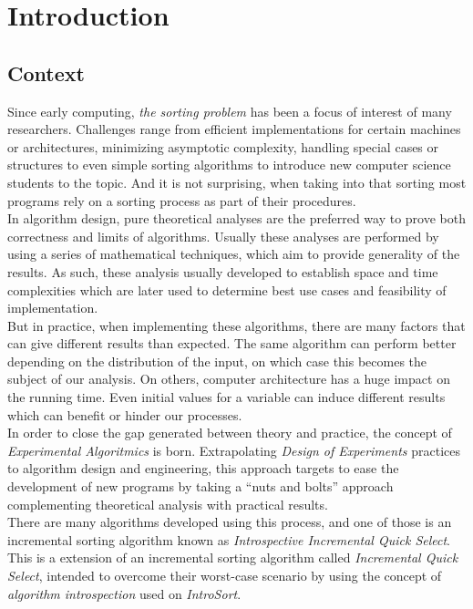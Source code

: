 \chapter{Introduction}

\section{Context}

Since early computing, \emph{the sorting problem} has been a focus of interest of many researchers. Challenges range from efficient implementations for certain machines or architectures, minimizing asymptotic complexity, handling special cases or structures to even simple sorting algorithms to introduce new computer science students to the topic. And it is not surprising, when taking into  that sorting most programs rely on a sorting process as part of their procedures.\\

In algorithm design, pure theoretical analyses are the preferred way to prove both correctness and limits of algorithms. Usually these analyses are performed by using a series of mathematical techniques, which aim to provide generality of the results. As such, these analysis usually developed to establish space and time complexities which are later used to determine best use cases and feasibility of implementation.\\

But in practice, when implementing these algorithms, there are many factors that can give different results than expected. The same algorithm can perform better depending on the distribution of the input, on which case this becomes the subject of our analysis. On others, computer architecture has a huge impact on the running time. Even initial values for a variable can induce different results which can benefit or hinder our processes. \\

In order to close the gap generated between theory and practice, the concept of \emph{Experimental Algoritmics} is born. Extrapolating \emph{Design of Experiments} practices to algorithm design and engineering, this approach targets to ease the development of new programs by taking a ``nuts and bolts'' approach complementing theoretical analysis with practical results. \\

There are many algorithms developed using this process, and one of those is an incremental sorting algorithm known as \emph{Introspective Incremental Quick Select}. This is a extension of an incremental sorting algorithm called \emph{Incremental Quick Select}, intended to overcome their worst-case scenario by using the concept of \emph{algorithm introspection} used on \emph{IntroSort}\cite{10.5555/261387.261395}.\\

